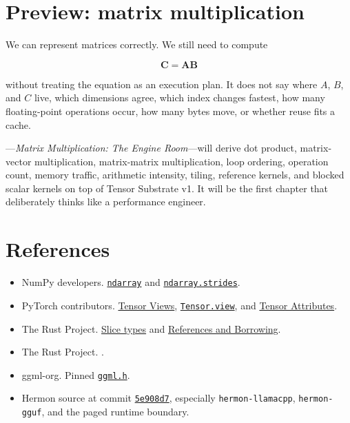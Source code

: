 \section{Preview: matrix
multiplication}\label{chapter-6-preview-matrix-multiplication}

We can represent matrices correctly. We still need to compute

\begin{equation}
\mathbf{C}=\mathbf{A}\mathbf{B}
\end{equation}

without treating the equation as an execution plan. It does not say
where \(A\), \(B\), and \(C\) live, which dimensions agree, which index
changes fastest, how many floating-point operations occur, how many
bytes move, or whether reuse fits a cache.

---\emph{Matrix Multiplication: The Engine Room}---will derive
dot product, matrix-vector multiplication, matrix-matrix multiplication,
loop ordering, operation count, memory traffic, arithmetic intensity,
tiling, reference kernels, and blocked scalar kernels on top of Tensor
Substrate v1. It will be the first chapter that deliberately thinks like
a performance engineer.

\section{References}\label{references-2}

\begin{itemize}
\tightlist
\item
  NumPy developers.
  \href{https://numpy.org/doc/stable/reference/generated/numpy.ndarray.html}{\texttt{ndarray}}
  and
  \href{https://numpy.org/doc/stable/reference/generated/numpy.ndarray.strides.html}{\texttt{ndarray.strides}}.
\item
  PyTorch contributors.
  \href{https://docs.pytorch.org/docs/stable/tensor_view.html}{Tensor
  Views},
  \href{https://docs.pytorch.org/docs/stable/generated/torch.Tensor.view.html}{\texttt{Tensor.view}},
  and
  \href{https://docs.pytorch.org/docs/stable/tensor_attributes.html}{Tensor
  Attributes}.
\item
The Rust Project.
  \href{https://doc.rust-lang.org/stable/reference/types/slice.html}{Slice
  types} and
  \href{https://doc.rust-lang.org/stable/book/ch04-02-references-and-borrowing.html}{References
  and Borrowing}.
\item
The Rust Project.
  \href{https://doc.rust-lang.org/std/primitive.usize.html\#method.checked_mul}{\texttt{}}.
\item
  ggml-org. Pinned
  \href{https://github.com/ggml-org/llama.cpp/blob/389ff61d77b5c71cec0cf92fe4e5d01ace80b797/ggml/include/ggml.h}{\texttt{ggml.h}}.
\item
  Hermon source at commit
  \href{https://github.com/hermonai/hermon/commit/5e908d75e4d5ee102f97f6a880ed4d0968d949df}{\texttt{5e908d7}},
  especially \texttt{hermon-llamacpp}, \texttt{hermon-gguf}, and the
  paged runtime boundary.
\end{itemize}



